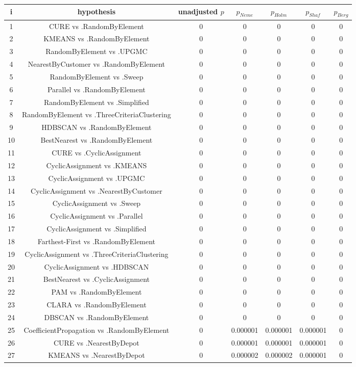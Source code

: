\documentclass[a4paper,10pt]{article}
\begin{document}
\begin{landscape}
\begin{table}[!htp]
\centering\scriptsize
\begin{tabular}{ccccccc}
i&hypothesis&unadjusted $p$&$p_{Neme}$&$p_{Holm}$&$p_{Shaf}$&$p_{Berg}$\\
\hline1&CURE vs .RandomByElement&0&0&0&0&0\\
2&KMEANS vs .RandomByElement&0&0&0&0&0\\
3&RandomByElement vs .UPGMC&0&0&0&0&0\\
4&NearestByCustomer vs .RandomByElement&0&0&0&0&0\\
5&RandomByElement vs .Sweep&0&0&0&0&0\\
6&Parallel vs .RandomByElement&0&0&0&0&0\\
7&RandomByElement vs .Simplified&0&0&0&0&0\\
8&RandomByElement vs .ThreeCriteriaClustering&0&0&0&0&0\\
9&HDBSCAN vs .RandomByElement&0&0&0&0&0\\
10&BestNearest vs .RandomByElement&0&0&0&0&0\\
11&CURE vs .CyclicAssignment&0&0&0&0&0\\
12&CyclicAssignment vs .KMEANS&0&0&0&0&0\\
13&CyclicAssignment vs .UPGMC&0&0&0&0&0\\
14&CyclicAssignment vs .NearestByCustomer&0&0&0&0&0\\
15&CyclicAssignment vs .Sweep&0&0&0&0&0\\
16&CyclicAssignment vs .Parallel&0&0&0&0&0\\
17&CyclicAssignment vs .Simplified&0&0&0&0&0\\
18&Farthest-First vs .RandomByElement&0&0&0&0&0\\
19&CyclicAssignment vs .ThreeCriteriaClustering&0&0&0&0&0\\
20&CyclicAssignment vs .HDBSCAN&0&0&0&0&0\\
21&BestNearest vs .CyclicAssignment&0&0&0&0&0\\
22&PAM vs .RandomByElement&0&0&0&0&0\\
23&CLARA vs .RandomByElement&0&0&0&0&0\\
24&DBSCAN vs .RandomByElement&0&0&0&0&0\\
25&CoefficientPropagation vs .RandomByElement&0&0.000001&0.000001&0.000001&0\\
26&CURE vs .NearestByDepot&0&0.000001&0.000001&0.000001&0\\
27&KMEANS vs .NearestByDepot&0&0.000002&0.000002&0.000001&0\\

\end{tabular}
\end{table}
\end{landscape}
\end{document}
